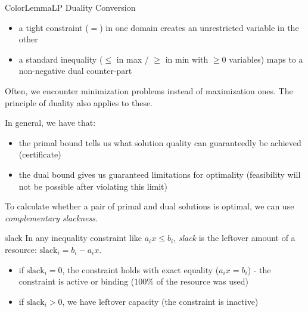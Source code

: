 \documentclass[a4paper, 11pt]{report}
\begin{document}
\begin{cframe}{ColorLemma}{LP Duality Conversion}{}
\vspace{4mm}
\begin{itemize}
    \item a tight constraint ($=$) in one domain creates an unrestricted variable in the other
    \item a standard inequality ($\le$ in max / $\ge$ in min with $\ge 0$ variables) maps to a non-negative dual counter-part
\end{itemize}
\end{cframe}

\begin{gframe}{}
   Often, we encounter minimization problems instead of maximization ones. The principle of duality also applies to these.

In general, we have that:
\begin{itemize}
    \item the primal bound tells us what solution quality can guaranteedly be achieved (certificate)
    \item the dual bound gives us guaranteed limitations for optimality (feasibility will not be possible after violating this limit)
\end{itemize} 
\end{gframe}

To calculate whether a pair of primal and dual solutions is optimal, we can use \textit{complementary slackness}.

\begin{gframe}{slack}
    In any inequality constraint like $a_i x \le b_i$, \textit{slack} is the leftover amount of a resource: $\text{slack}_i = b_i - a_i x$.

\begin{itemize}
    \item if $\text{slack}_i = 0$, the constraint holds with exact equality ($a_i x = b_i$) - the constraint is active or binding ($100\%$ of the resource was used)
    \item if $\text{slack}_i > 0$, we have leftover capacity (the constraint is inactive)
\end{itemize}
\end{gframe}
\end{document}
